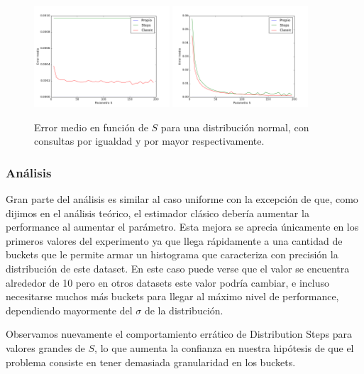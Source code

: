 \begin{figure}[h!]
  \centering
  \includegraphics[width=0.45\textwidth]{../source/datasets/img/normalEqual}
  \includegraphics[width=0.45\textwidth]{../source/datasets/img/normalGreater}
  \caption{Error medio en función de $S$ para una distribución normal, con consultas por igualdad y por mayor respectivamente.}
 \end{figure}

 \subsubsection*{Análisis}
Gran parte del análisis es similar al caso uniforme con la excepción de que, como dijimos en el análisis teórico, el estimador clásico debería aumentar la performance al aumentar el parámetro. Esta mejora se aprecia únicamente en los primeros valores del experimento ya que llega rápidamente a una cantidad de buckets que le permite armar un histograma que caracteriza con precisión la distribución de este dataset. En este caso puede verse que el valor se encuentra alrededor de 10 pero en otros datasets este valor podría cambiar, e incluso necesitarse muchos más buckets para llegar al máximo nivel de performance, dependiendo mayormente del $\sigma$ de la distribución.

Observamos nuevamente el comportamiento errático de Distribution Steps para valores grandes de $S$, lo que aumenta la confianza en nuestra hipótesis de que el problema consiste en tener demasiada granularidad en los buckets.

